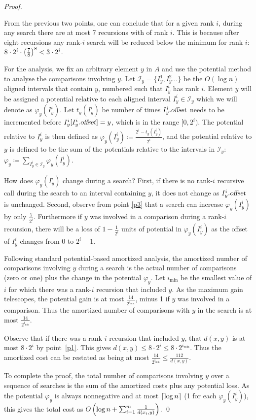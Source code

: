 \begin{proof}
\begin{compactenum}
\item \label{p3} From the previous two points, one can conclude that for a given rank $i$, during any search there are at most 7 recursions with of rank $i$. This is because after eight recursions any rank-$i$ search will be reduced below the minimum for rank $i$:  $8 \cdot 2^i \cdot \left( \frac{7}{8} \right)^8 <3 \cdot 2^i$.
\end{compactenum}

For the analysis, we fix an arbitrary element $y$ in $A$ and use the potential method to analyse the comparisons involving $y$. 
Let $\mathcal{I}_y=\{I_y^1,I_y^2\ldots\}$ be the $O(\log n)$ aligned intervals that contain $y$, numbered such that $I_y^i$ has rank $i$.
Element $y$ will be assigned a potential relative to each aligned interval $I_y^i\in \mathcal{I}_y$ which we will denote as $\varphi_y(I_y^i)$. 
Let $t_y(I_y^i)$ be number of times $I_y^i.\text{\sl offset}$ needs to be incremented before $I_y^i[I_y^i.\text{\sl offset}]=y$, which is in the range $[0,2^i)$. 
The potential relative to $I^i_y$ is then defined as $\varphi_y(I_y^i)\coloneqq \frac{2^i-t_y(I^i_y)}{2^i}$, and the potential relative to $y$ is defined to be the sum of the potentials relative to the intervals in $\mathcal{I}_y$: $\varphi_y \coloneqq \sum_{I^i_y\in\mathcal{I}_y} \varphi_y(I_y^i)$.

How does $\varphi_y(I_y^i)$ change during a search? 
First, if there is no rank-$i$ recursive call during the search to an interval containing $y$, it does not change as $I_y^i.\text{\sl offset}$ is unchanged.
Second, observe from point \ref{p3} that a search can increase $\varphi_y (I_y^i)$ by only $\frac{7}{2^i}$.
Furthermore if $y$ was involved in a comparison during a rank-$i$ recursion, there will be a loss of $1-\frac{1}{2^i}$ units of potential in $\varphi_y(I_y^i)$ as the offset of $I_y^i$ changes from 0 to $2^i-1$.

Following standard potential-based amortized analysis, the amortized number of comparisons involving $y$ during a search is the actual number of comparisons (zero or one) plus the change in the potential $\varphi_y $. 
Let $i_{\min}$ be the smallest value of $i$ for which there was a rank-$i$ recursion that included $y$. As the maximum gain telescopes, the potential gain is at most $\frac{14}{2^{i_{\min}}}$, minus 1 if $y$ was involved in a comparison. 
Thus the amortized number of comparisons with $y$ in the search is at most $\frac{14}{2^{i_{\min}}}$.

Observe that if there was a rank-$i$ recursion that included $y$, that $d(x,y)$ is at most $8\cdot 2^i$ by point~\ref{p1}.
This gives $d(x,y)\leq 8\cdot 2^i \leq 8\cdot 2^{i_{\min}}$.
Thus the amortized cost  can be restated as being at most
$ \frac{14}{2^{i_{\min}}}\leq \frac{112}{d(x,y)}$. 

To complete the proof, the total number of comparisons involving $y$ over a sequence of searches is the sum of the amortized costs plus any potential loss. As the potential $\varphi_y$ is always nonnegative and at most $\lceil \log n \rceil$ (1 for each $\varphi_y(I^i_y)$), this gives the total cost as $O\left(  \log n+ \sum_{i=1}^m \frac{1}{d(x_i,y)} \right)$. \qed
\end{proof}

